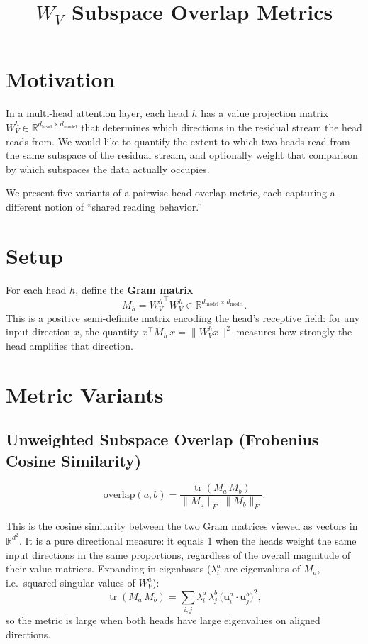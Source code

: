 \documentclass[11pt]{article}
\title{$W_V$ Subspace Overlap Metrics}
\author{}
\date{}
\newcommand{\WV}{W_V}
\newcommand{\frob}[1]{\lVert #1 \rVert_F}
\newcommand{\tr}{\operatorname{tr}}
\begin{document}
\maketitle

\section{Motivation}

In a multi-head attention layer, each head $h$ has a value projection matrix $\WV^h \in \mathbb{R}^{d_{\text{head}} \times d_{\text{model}}}$ that determines which directions in the residual stream the head reads from.
We would like to quantify the extent to which two heads read from the same subspace of the residual stream, and optionally weight that comparison by which subspaces the data actually occupies.

We present five variants of a pairwise head overlap metric, each capturing a different notion of ``shared reading behavior.''

\section{Setup}

For each head $h$, define the \textbf{Gram matrix}
\[
    M_h = {\WV^h}^\top \WV^h \in \mathbb{R}^{d_{\text{model}} \times d_{\text{model}}}.
\]
This is a positive semi-definite matrix encoding the head's receptive field: for any input direction $x$, the quantity $x^\top M_h\, x = \lVert \WV^h x \rVert^2$ measures how strongly the head amplifies that direction.

\section{Metric Variants}

\subsection{Unweighted Subspace Overlap (Frobenius Cosine Similarity)}

\[
    \text{overlap}(a, b) = \frac{\tr(M_a\, M_b)}{\frob{M_a}\;\frob{M_b}}.
\]

This is the cosine similarity between the two Gram matrices viewed as vectors in $\mathbb{R}^{d^2}$. It is a pure directional measure: it equals 1 when the heads weight the same input directions in the same proportions, regardless of the overall magnitude of their value matrices. Expanding in eigenbases ($\lambda_i^a$ are eigenvalues of $M_a$, i.e.\ squared singular values of $\WV^a$):
\[
    \tr(M_a\, M_b) = \sum_{i,j} \lambda_i^a\, \lambda_j^b\, \bigl(\bm{u}_i^a \cdot \bm{u}_j^b\bigr)^2,
\]
so the metric is large when both heads have large eigenvalues on aligned directions.
\end{document}
